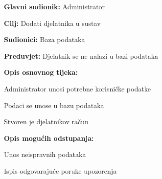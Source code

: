 		   	\noindent {}
				\begin{packed_item}
						
						\item \textbf{Glavni sudionik: }Administrator
						\item  \textbf{Cilj:} Dodati djelatnika u sustav
						\item  \textbf{Sudionici:} Baza podataka
						\item  \textbf{Preduvjet:} Djelatnik se ne nalazi u bazi podataka
						\item  \textbf{Opis osnovnog tijeka:}
						
						\item[] \begin{packed_enum}
							
							\item Administrator unosi potrebne korisničke podatke
							\item Podaci se unose u bazu podataka
							\item Stvoren je djelatnikov račun
							
						\end{packed_enum}
						
						\item  \textbf{Opis mogućih odstupanja:}
						
						\item[] \begin{packed_item}
							
							\item[1.a] Unos neispravnih podataka
							\item[] \begin{packed_enum}
								
								\item Ispis odgovarajuće poruke upozorenja
								
								
							\end{packed_enum}
							
							
						\end{packed_item}
					\end{packed_item}
				
